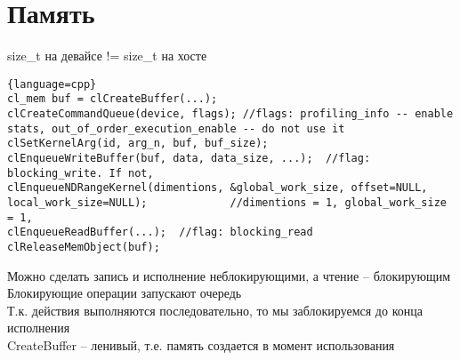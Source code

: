 \documentclass[12pt]{article}
\begin{document}
\section{Память}
size\_t на девайсе != size\_t на хосте
\begin{lstlisting}{language=cpp}
cl_mem buf = clCreateBuffer(...);
clCreateCommandQueue(device, flags); //flags: profiling_info -- enable stats, out_of_order_execution_enable -- do not use it
clSetKernelArg(id, arg_n, buf, buf_size);
clEnqueueWriteBuffer(buf, data, data_size, ...);  //flag: blocking_write. If not, 
clEnqueueNDRangeKernel(dimentions, &global_work_size, offset=NULL, local_work_size=NULL);             //dimentions = 1, global_work_size = 1, 
clEnqueueReadBuffer(...);  //flag: blocking_read
clReleaseMemObject(buf);
\end{lstlisting}
Можно сделать запись и исполнение неблокирующими, а чтение -- блокирующим\\
Блокирующие операции запускают очередь\\
Т.к. действия выполняются последовательно, то мы заблокируемся до конца исполнения\\
CreateBuffer -- ленивый, т.е. память создается в момент использования\\
\end{document}
